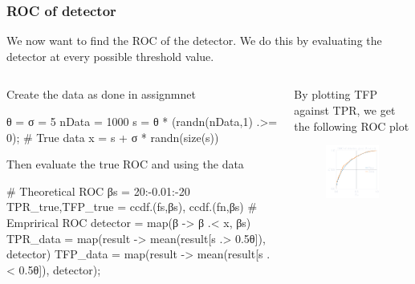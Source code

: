 \documentclass[compress,aspectratio=169]{beamer}
\begin{document}
\begin{frame}[fragile] %
    \frametitle{ROC of detector}
    We now want to find the ROC of the detector. We do this by evaluating the detector
    at every possible threshold value.
    \begin{columns}
        \begin{column}{0.51\textwidth}
            Create the data as done in assignmnet
            \begin{jllisting}[gobble=16]
                θ = σ = 5
                nData = 1000
                s = θ * (randn(nData,1) .>= 0); # True data
                x = s + σ * randn(size(s))
            \end{jllisting}
            Then evaluate the true ROC and using the data
            \begin{jllisting}[gobble=16]
                # Theoretical ROC
                βs = 20:-0.01:-20
                TPR_true,TFP_true = ccdf.(fs,βs), ccdf.(fn,βs)
                # Emprirical ROC
                detector = map(β -> β .< x, βs)
                TPR_data = map(result -> mean(result[s .> 0.5θ]), detector)
                TFP_data = map(result -> mean(result[s .< 0.5θ]), detector);
            \end{jllisting}
        \end{column}
        \begin{column}{0.49\textwidth}
            By plotting TFP against TPR, we get the following ROC plot
            \begin{figure}
                \includegraphics[width=0.7\columnwidth]{"../d.pdf"}
            \end{figure}
        \end{column}
    \end{columns}
\end{frame} 
\end{document}

